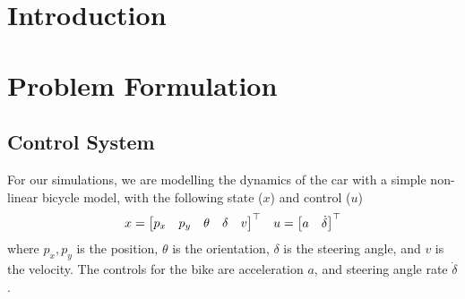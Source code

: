 \documentclass[11pt]{article}
\begin{document}
    \headingsshared
    
    \section{Introduction}
    
    \section{Problem Formulation} \label{sec:prob}
    \subsection{Control System} \label{sec:prob:control}
    For our simulations, we are modelling the dynamics of the car with a simple non-linear bicycle model, with the following state ($x$) and control ($u$)
    \begin{align*} 
        x = {\begin{bmatrix}p_x & p_y & \theta & \delta & v\end{bmatrix}}^{\top} &&
        u = {\begin{bmatrix}a & \dot{\delta}\end{bmatrix}}^{\top}
    \end{align*}
    where $p_x, p_y$ is the position, $\theta$ is the orientation, $\delta$ is the steering angle, and $v$ is the velocity. The controls for the bike are acceleration $a$, and steering angle rate $\dot{\delta}$.
    
\end{document}
